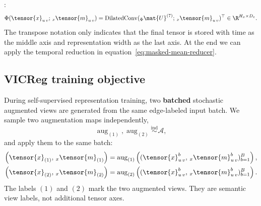 :
\[
  \Phi(\tensor{x}_{u\,v};\,{}_{x}\tensor{m}_{u\,v})
  =
  \operatorname{DilatedConv}
  ({}_{\Phi}\mat{U}^{(7)};\,{}_{x}\tensor{m}_{u\,v})^{\top}
  \in
  \R^{H_x \times D_e}.
\]
The transpose notation only indicates that the final tensor is stored with time
as the middle axis and representation width as the last axis. At the end we can 
apply the temporal reduction in equation~\eqref{eq:masked-mean-reducer}.
























\subsection{VICReg training objective}
\label{subsec:vicreg-training-objective}

During self-supervised representation training, two \textbf{batched}
stochastic augmented views%
are generated from the same edge-labeled input batch.  We sample two
augmentation maps independently,
\[
  \operatorname{aug}_{(1)},\operatorname{aug}_{(2)}
  \overset{\mathrm{ind}}{\sim}
  \mathcal{A},
\]
and apply them to the same batch:
\[
  \begin{aligned}
    \left(
      \tensor{x}_{(1)},\,{}_{x}\tensor{m}_{(1)}
    \right)
    &=
    \operatorname{aug}_{(1)}
    \left(
      (\tensor{x}_{u\,v}^{b},\,{}_{x}\tensor{m}_{u\,v}^{b})_{b=1}^{B}
    \right),
    \\
    \left(
      \tensor{x}_{(2)},\,{}_{x}\tensor{m}_{(2)}
    \right)
    &=
    \operatorname{aug}_{(2)}
    \left(
      (\tensor{x}_{u\,v}^{b},\,{}_{x}\tensor{m}_{u\,v}^{b})_{b=1}^{B}
    \right).
  \end{aligned}
\]
The labels $(1)$ and $(2)$ mark the two augmented views.  They are semantic view
labels, not additional tensor axes.

